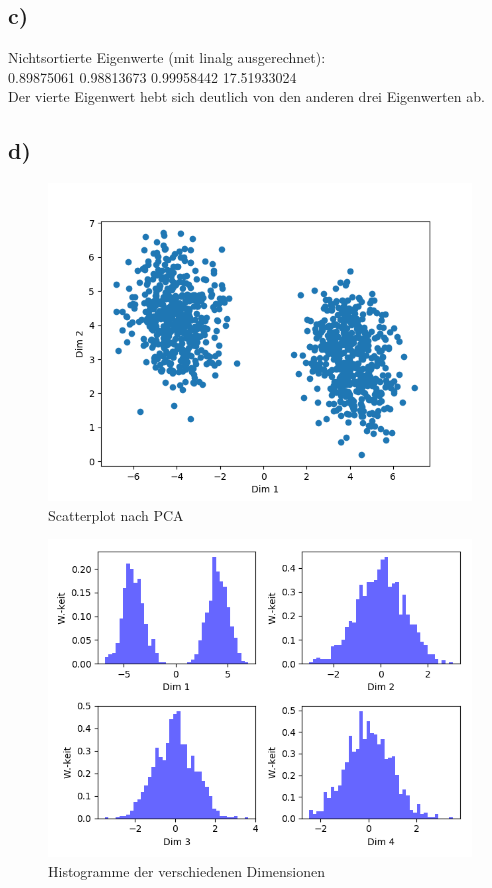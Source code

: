 \subsection{c)}
Nichtsortierte Eigenwerte (mit linalg ausgerechnet):
\\
0.89875061  0.98813673  0.99958442 17.51933024
\\
Der vierte Eigenwert hebt sich deutlich von den anderen drei Eigenwerten ab.
\subsection{d)}

\begin{figure}
  \includegraphics{plots/scatterplot_d.png}
  \caption{Scatterplot nach PCA}
  \label{fig:scatterplotnach}
\end{figure}

\begin{figure}
  \includegraphics{plots/histogrammi.png}
  \caption{Histogramme der verschiedenen Dimensionen}
  \label{fig:hist}
\end{figure}
